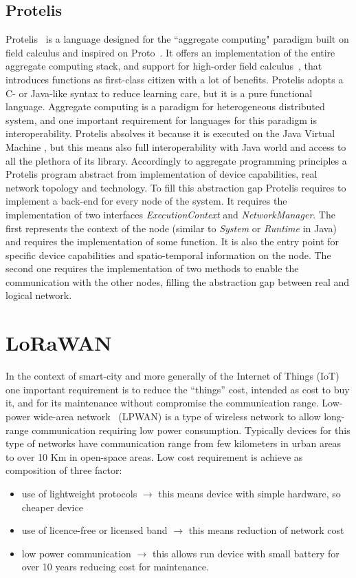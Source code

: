 \subsection{Protelis}
\label{subSec:Protelis}
Protelis~\cite{PianiniSAC2015} is a language designed for the ``aggregate computing" paradigm built on field calculus and inspired on Proto~\cite{Proto}. 
It offers an implementation of the entire aggregate computing stack, and support for high-order field calculus~\cite{ViroliTOCL2016}, that introduces functions as first-class citizen with a lot of benefits.
Protelis adopts a C- or Java-like syntax to reduce learning care, but it is a pure functional language.
Aggregate computing is a paradigm for heterogeneous distributed system, and one important requirement for languages for this paradigm is interoperability.
Protelis absolves it because it is executed on the Java Virtual Machine%
, but this means also full interoperability with Java world and access to all the plethora of its library.
Accordingly to aggregate programming principles a Protelis program abstract from implementation of device capabilities, real network topology and technology. 
To fill this abstraction gap Protelis requires to implement a back-end for every node of the system.
It requires the implementation of two interfaces \textit{ExecutionContext} and \textit{NetworkManager}. 
The first represents the context of the node (similar to \textit{System} or \textit{Runtime} in Java) and requires the implementation of some function. It is also the entry point for specific device capabilities and spatio-temporal information on the node. The second one requires the implementation of two methods to enable the communication with the other nodes, filling the abstraction gap between real and logical network.
\clearpage
\section{LoRaWAN}
\label{sec:LoRaWAN}

In the context of smart-city and more generally of the Internet of Things (IoT) one important requirement is to reduce the ``things'' cost, intended as cost to buy it, and for its maintenance without compromise the communication range.
Low-power wide-area network~\cite{Raza2017} (LPWAN) is a type of wireless network to allow long-range communication requiring low power consumption.
Typically devices for this type of networks have communication range from few kilometers in urban areas to over 10 Km in open-space areas.
Low cost requirement is achieve as composition of three factor:
\begin{itemize}
    \item use of lightweight protocols $\rightarrow$ this means device with simple hardware, so cheaper device
    \item use of licence-free or licensed band $\rightarrow$ this means reduction of network cost
    \item low power communication $\rightarrow$ this allows run device with small battery for over 10 years reducing cost for maintenance.
\end{itemize}

